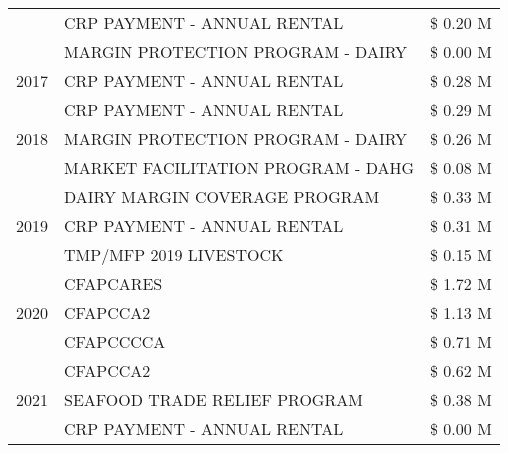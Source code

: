 \begin{tabular}{llr}
 & CRP PAYMENT - ANNUAL RENTAL & \$ 0.20 M \\
 & MARGIN PROTECTION PROGRAM - DAIRY & \$ 0.00 M \\
\cline{1-3}
2017 & CRP PAYMENT - ANNUAL RENTAL & \$ 0.28 M \\
\cline{1-3}
\multirow[t]{3}{*}{2018} & CRP PAYMENT - ANNUAL RENTAL & \$ 0.29 M \\
 & MARGIN PROTECTION PROGRAM - DAIRY & \$ 0.26 M \\
 & MARKET FACILITATION PROGRAM - DAHG & \$ 0.08 M \\
\cline{1-3}
\multirow[t]{3}{*}{2019} & DAIRY MARGIN COVERAGE PROGRAM & \$ 0.33 M \\
 & CRP PAYMENT - ANNUAL RENTAL & \$ 0.31 M \\
 & TMP/MFP 2019 LIVESTOCK & \$ 0.15 M \\
\cline{1-3}
\multirow[t]{3}{*}{2020} & CFAPCARES & \$ 1.72 M \\
 & CFAPCCA2 & \$ 1.13 M \\
 & CFAPCCCCA & \$ 0.71 M \\
\cline{1-3}
\multirow[t]{3}{*}{2021} & CFAPCCA2 & \$ 0.62 M \\
 & SEAFOOD TRADE RELIEF PROGRAM & \$ 0.38 M \\
 & CRP PAYMENT - ANNUAL RENTAL & \$ 0.00 M \\
\cline{1-3}
\bottomrule
\end{tabular}
